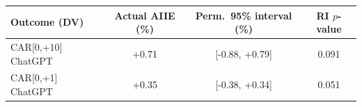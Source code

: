 \begin{tabular}{lccc}
\toprule
Outcome (DV) & Actual AIIE (\%) & Perm.\ 95\% interval (\%) & RI $p$-value \\
\midrule
CAR[0,+10] ChatGPT & +0.71 & [-0.88, +0.79] & 0.091 \\
CAR[0,+1] ChatGPT & +0.35 & [-0.38, +0.34] & 0.051 \\
\bottomrule
\end{tabular}